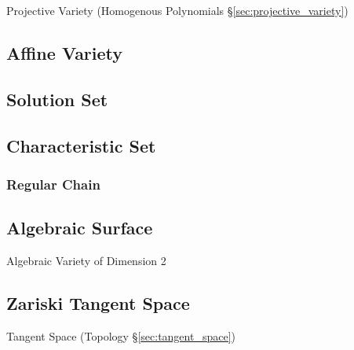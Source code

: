 \fist Projective Variety (Homogenous Polynomials \S\ref{sec:projective_variety})



\subsection{Affine Variety}\label{sec:affine_variety}

\subsection{Solution Set}\label{sec:solution_set}

\subsection{Characteristic Set}\label{sec:characteristic_set}

\subsubsection{Regular Chain}\label{sec:regular_chain}



\subsection{Algebraic Surface}\label{sec:algebraic_surface}

Algebraic Variety of Dimension 2



\subsection{Zariski Tangent Space}\label{sec:zariski_space}

Tangent Space (Topology \S\ref{sec:tangent_space})

